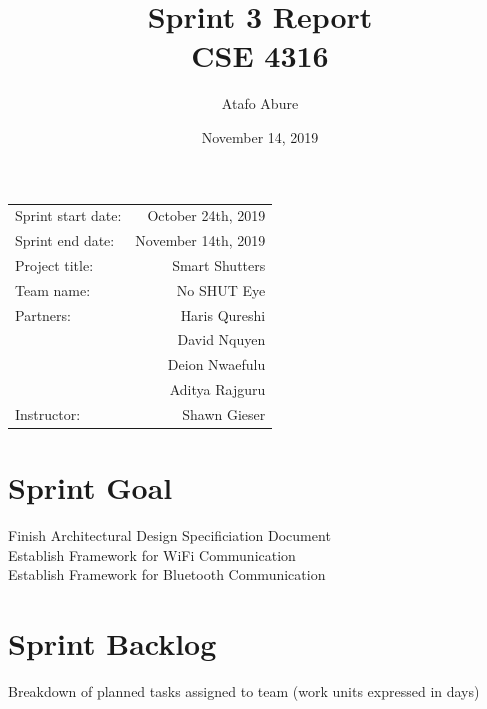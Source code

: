 \documentclass{article}
\title{Sprint 3 Report \\ CSE 4316}
\author{Atafo Abure}
\date{November 14, 2019}
\begin{document}
\maketitle
\begin{center}
\begin{tabular}{l r}

Sprint start date: & October 24th, 2019 \\

Sprint end date: & November 14th, 2019 \\

Project title: & Smart Shutters \\

Team name: & No SHUT Eye \\

Partners: 	& Haris Qureshi\\
			& David Nquyen\\
			& Deion Nwaefulu \\
        	& Aditya Rajguru \\
Instructor: & Shawn Gieser
\end{tabular}
\end{center}

\section{Sprint Goal}
Finish Architectural Design Specificiation Document \\
Establish Framework for WiFi Communication \\
Establish Framework for Bluetooth Communication \\

\section{Sprint Backlog}
Breakdown of planned tasks assigned to team (work units expressed in days) \\ %
\end{document}
